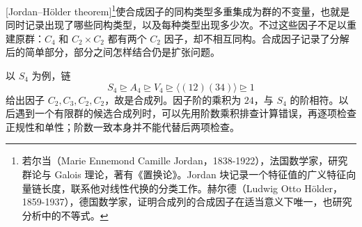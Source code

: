 [Jordan--Hölder theorem]\footnote{若尔当（Marie Ennemond Camille Jordan，1838-1922），法国数学家，研究群论与 Galois 理论，著有《置换论》。Jordan 块记录一个特征值的广义特征向量链长度，联系他对线性代换的分类工作。赫尔德（Ludwig Otto Hölder，1859-1937），德国数学家，证明合成列的合成因子在适当意义下唯一，也研究分析中的不等式。}使合成因子的同构类型多重集成为群的不变量，也就是同时记录出现了哪些同构类型，以及每种类型出现多少次。不过这些因子不足以重建原群：\(C_4\) 和 \(C_2\times C_2\) 都有两个 \(C_2\) 因子，却不相互同构。合成因子记录了分解后的简单部分，部分之间怎样结合仍是扩张问题。

\ProseParagraphBreak
以 \(S_4\) 为例，链
\[
	S_4\trianglerighteq A_4\trianglerighteq V_4 \trianglerighteq\bigl\langle(12)(34)\bigr\rangle\trianglerighteq1
\]
给出因子 \(C_2,C_3,C_2,C_2\)，故是合成列。因子阶的乘积为 \(24\)，与 \(S_4\) 的阶相符。以后遇到一个有限群的候选合成列时，可以先用阶数乘积排查计算错误，再逐项检查正规性和单性；阶数一致本身并不能代替后两项检查。
